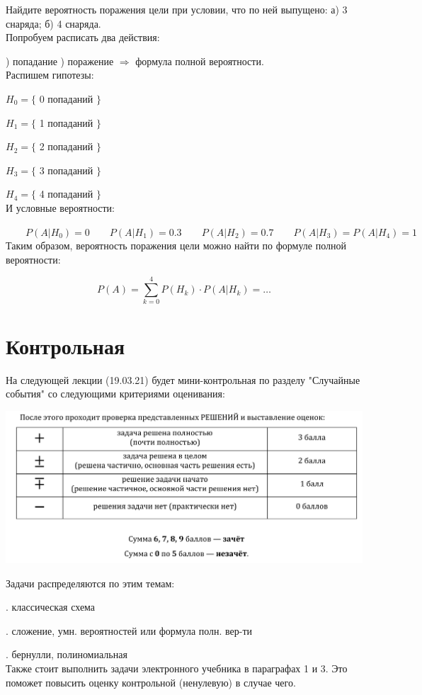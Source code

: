 \documentclass{article}
\begin{document}
Найдите вероятность поражения цели при условии, что по ней выпущено: а) 3 снаряда; б) 4 снаряда.
\\

Попробуем расписать два действия:

) попадание \qquad{}) поражение \qquad\qquad$\Rightarrow$ формула полной вероятности.
\\

Распишем гипотезы:

\qquad$H_0 = \{$ 0 попаданий $\}$

\qquad$H_1 = \{$ 1 попаданий $\}$

\qquad$H_2 = \{$ 2 попаданий $\}$

\qquad$H_3 = \{$ 3 попаданий $\}$

\qquad$H_4 = \{$ 4 попаданий $\}$
\\

И условные вероятности:

$\qquad P(A | H_0) = 0 \qquad P(A|H_1) = 0.3 \qquad P(A|H_2) = 0.7 \qquad P(A|H_3) = P(A|H_4) = 1$
\\

Таким образом, вероятность поражения цели можно найти по формуле полной вероятности:

$$P(A) = \sum\limits_{k = 0}^4 P(H_k) \cdot P(A|H_k) = \ldots$$

\section{Контрольная}

На следующей лекции (19.03.21) будет мини-контрольная по разделу "Случайные события" со следующими критериями оценивания:

\begin{center}
    \includegraphics[scale=0.25]{Критерии.png}
\end{center}

Задачи распределяются по этим темам:

. классическая схема

. сложение, умн. вероятностей или формула полн. вер-ти

. бернулли, полиномиальная
\\

Также стоит выполнить задачи электронного учебника в параграфах 1 и 3. Это поможет повысить оценку контрольной (ненулевую) в случае чего.
\end{document}
